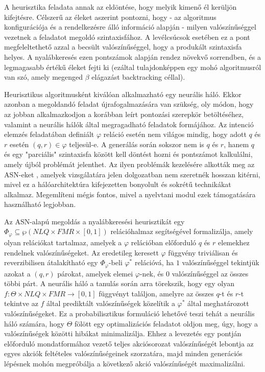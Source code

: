 \documentclass[twoside, 12pt]{report}
\begin{document}
A heurisztika feladata annak az eldöntése, hogy melyik kimenő él kerüljön kifejtésre. Célszerű az éleket aszerint pontozni, hogy - az algoritmus konfigurációja és a rendelkezésre álló információ alapján - milyen valószínűséggel vezetnek a feladatot megoldó szintaxisfához. A levélcsúcsok esetében ez a pont megfeleltethető azzal a becsült valószínűséggel, hogy a produkált szintaxisfa helyes. A nyalábkeresés ezen pontszámok alapján rendez növekvő sorrendben, és a legmagasabb értékű éleket fejti ki (ezáltal tulajdonképpen egy mohó algoritmusról van szó, amely megenged $\beta$ elágazást backtracking céllal).

Heurisztikus algoritmusként kiválóan alkalmazható egy neurális háló. Ekkor azonban a megoldandó feladat újrafogalmazására van szükség, oly módon, hogy az jobban alkalmazkodjon a korábban leírt pontozási szerepkör betöltéséhez, valamint a neurális hálók által megragadható feladatok formájához. Az intenció elemzés feladatában definiált $\varphi$ reláció esetén nem világos mindig, hogy adott $q$ és $r$ esetén $(q, r) \in \varphi$ teljesül-e. A generálás során sokszor nem is $q$ és $r$, hanem $q$ és egy "parciális" szintaxisfa között kell döntést hozni és pontszámot kalkulálni, amely újból problémát jelenthet. Az ilyen problémák kezelésére alkották meg az ASN-eket \parencite{RSK17a}, amelyek vizsgálatára jelen dolgozatban nem szeretnék hosszan kitérni, mivel ez a hálóarchitektúra kifejezetten bonyolult és sokrétű technikákat alkalmaz. Megemlíteni mégis fontos, mivel a nyelvtani modul ezek támogatására használható legjobban.

Az ASN-alapú megoldás a nyalábkeresési heurisztikát egy $\Phi_{\varphi} \subseteq \wp(NLQ \times FMR \times [0,1])$ relációhalmaz segítségével formalizálja, amely olyan relációkat tartalmaz, amelyek a $\varphi$ relációban előforduló $q$ és $r$ elemekhez rendelnek valószínűségeket. Az eredetileg keresett $\varphi$ függvény triviálisan és reverzibilisen átalakítható egy $\Phi_{\varphi}$-beli $\varphi^{*}$ relációvá, ha $1$ valószínűséggel tekintjük azokat a $(q, r)$ párokat, amelyek elemei $\varphi$-nek, és $0$ valószínűséggel az összes többi párt. A neurális háló a tanulás során arra törekszik, hogy egy olyan $f : \Theta \times NLQ \times FMR \to [0,1]$ függvényt\footnotemark{} találjon, amelyre az összes $q$-t és $r$-t tekintve az $f$ által prediktált valószínűségek közelítik a $\varphi^{*}$ által meghatározott valószínűségeket. Ez a probabilisztikus formuláció lehetővé teszi tehát a neurális háló számára, hogy $\Theta$ fölött egy optimalizációs feladatot oldjon meg, úgy, hogy a valószínűségek közötti hibákat minimalizálja. Ehhez a levezetés egy pontján előforduló mondatformához vezető teljes akciósorozat valószínűségét lebontja az egyes akciók feltételes valószínűségeinek szorzatára, majd minden generációs lépésnek mohón megpróbálja a következő akció valószínűségét maximalizálni.
\end{document}
